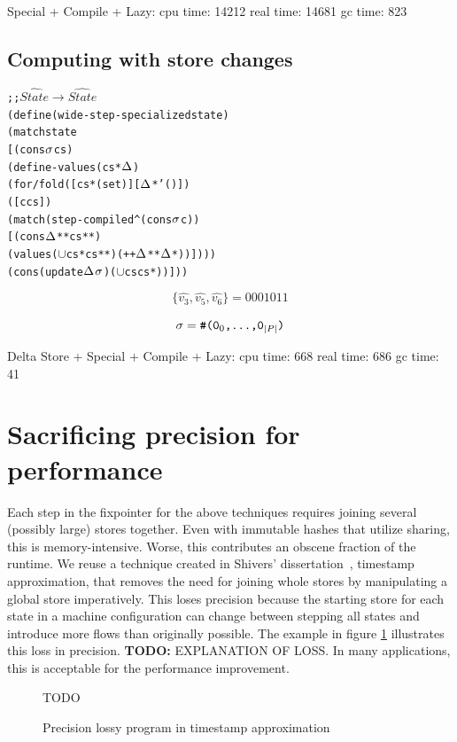 \documentclass[preprint,onecolumn,9pt]{sigplanconf} %
\begin{document}
Special + Compile + Lazy:
   cpu time: 14212 real time: 14681 gc time: 823

\subsection{Computing with store changes}

\begin{alltt}
;; \(\widehat{State} \to \widehat{State}\)
(define (wide-step-specialized state)
  (match state
    [(cons \(\msto\) cs)
     (define-values (cs* \(\msdiff\))
       (for/fold ([cs* (set)] [\(\msdiff\)* '()])
         ([c cs])
         (match (step-compiled^ (cons \(\msto\) c))
           [(cons \(\msdiff\)** cs**)
            (values (\(\cup\) cs* cs**) (++ \(\msdiff\)** \(\msdiff\)*))])))
     (cons (update \(\msdiff\) \(\msto\)) (\(\cup\) cs cs*))]))
\end{alltt}

\[
\{ \widehat{v_3}, \widehat{v_5}, \widehat{v_6} \} = 0001011
\]

\[
\sigma = \mbox{\tt \#(0$_0$,\dots,0$_{|P|}$)}
\]

Delta Store + Special + Compile + Lazy:
   cpu time: 668 real time: 686 gc time: 41

\section{Sacrificing precision for performance}

Each step in the fixpointer for the above techniques requires joining
several (possibly large) stores together. Even with immutable hashes
that utilize sharing, this is memory-intensive. Worse, this
contributes an obscene fraction of the runtime. We reuse a technique
created in Shivers' dissertation~\cite{ianjohnson:Shivers:1991:CFA},
timestamp approximation, that removes the need for joining whole
stores by manipulating a global store imperatively. This loses
precision because the starting store for each state in a machine
configuration can change between stepping all states and introduce
more flows than originally possible. The example in figure
\ref{fig:timestamp} illustrates this loss in precision. {\bf TODO:}
EXPLANATION OF LOSS. In many applications, this is acceptable for the
performance improvement.

\begin{figure}
TODO
\caption{Precision lossy program in timestamp approximation}
\label{fig:timestamp}
\end{figure}
\end{document}
